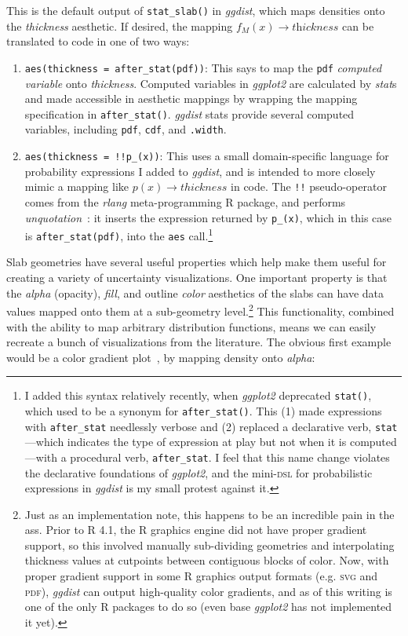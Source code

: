 \documentclass[journal]{vgtc}                     %
\begin{document}
This is the default output of \texttt{stat\_slab()} in \textit{ggdist}, which maps densities onto the \textit{thickness} aesthetic. If desired, the mapping $f_M(x) \rightarrow \textit{thickness}$ can be translated to code in one of two ways:

\begin{enumerate}
    \item \texttt{aes(thickness = after\_stat(pdf))}: This says to map the \texttt{pdf} \textit{computed variable} onto \textit{thickness}. Computed variables in \textit{ggplot2} are calculated by \textit{stat}s and made accessible in aesthetic mappings by wrapping the mapping specification in \texttt{after\_stat()}. \textit{ggdist} stats provide several computed variables, including \texttt{pdf}, \texttt{cdf}, and \texttt{.width}.
    \item \texttt{aes(thickness = !!p\_(x))}:  This uses a small domain-specific language for probability expressions I added to \textit{ggdist}, and is intended to more closely mimic a mapping like $p(x) \rightarrow thickness$ in code. The \texttt{!!} pseudo-operator comes from the \textit{rlang} meta-programming R package, and performs \textit{unquotation}~\cite{wickham2019advanced}: it inserts the expression returned by \texttt{p\_(x)}, which in this case is \texttt{after\_stat(pdf)}, into the \texttt{aes} call.\footnote{I added this syntax relatively recently, when \textit{ggplot2} deprecated \texttt{stat()}, which used to be a synonym for \texttt{after\_stat()}. This (1) made expressions with \texttt{after\_stat} needlessly verbose and (2) replaced a declarative verb, \texttt{stat}---which indicates the type of expression at play but not when it is computed---with a procedural verb, \texttt{after\_stat}. I feel that this name change violates the declarative foundations of \textit{ggplot2}, and the mini-\textsc{dsl} for probabilistic expressions in \textit{ggdist} is my small protest against it.}
\end{enumerate}

Slab geometries have several useful properties which help make them useful for creating a variety of uncertainty visualizations. One important property is that the \textit{alpha} (opacity), \textit{fill}, and outline \textit{color} aesthetics of the slabs can have data values mapped onto them at a sub-geometry level.\footnote{Just as an implementation note, this happens to be an incredible pain in the ass. Prior to R 4.1, the R graphics engine did not have proper gradient support, so this involved manually sub-dividing geometries and interpolating thickness values at cutpoints between contiguous blocks of color. Now, with proper gradient support in some R graphics output formats (e.g. \textsc{svg} and \textsc{pdf}), \textit{ggdist} can output high-quality color gradients, and as of this writing is one of the only R packages to do so (even base \textit{ggplot2} has not implemented it yet).} This functionality, combined with the ability to map arbitrary distribution functions, means we can easily recreate a bunch of visualizations from the literature. The obvious first example would be a color gradient plot~\cite{jackson2008displaying}, by mapping density onto \textit{alpha}:
\end{document}
